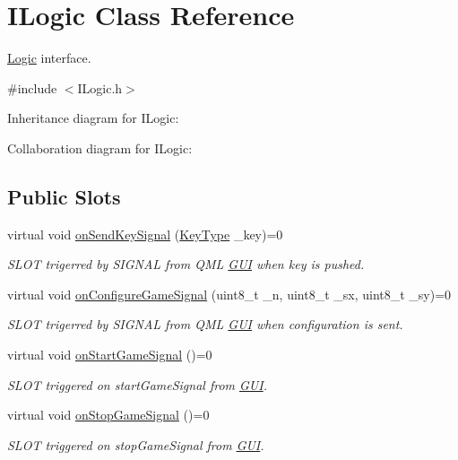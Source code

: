 \hypertarget{class_i_logic}{\section{I\+Logic Class Reference}
\label{class_i_logic}
}


\hyperlink{class_logic}{Logic} interface.  




{\ttfamily \#include $<$I\+Logic.\+h$>$}



Inheritance diagram for I\+Logic\+:


Collaboration diagram for I\+Logic\+:
\subsection*{Public Slots}
\begin{DoxyCompactItemize}
\item 
virtual void \hyperlink{class_i_logic_a9213bc5b19c4767ae204934deeca7f7e}{on\+Send\+Key\+Signal} (\hyperlink{_i_key_type_8h_aab0feaba617470cb4aa830dc5935238c}{Key\+Type} \+\_\+key)=0
\begin{DoxyCompactList}\small\item\em S\+L\+O\+T trigerred by S\+I\+G\+N\+A\+L from Q\+M\+L \hyperlink{class_g_u_i}{G\+U\+I} when key is pushed. \end{DoxyCompactList}\item 
virtual void \hyperlink{class_i_logic_a54891f02ea7efb94ac870251087499e7}{on\+Configure\+Game\+Signal} (uint8\+\_\+t \+\_\+n, uint8\+\_\+t \+\_\+sx, uint8\+\_\+t \+\_\+sy)=0
\begin{DoxyCompactList}\small\item\em S\+L\+O\+T trigerred by S\+I\+G\+N\+A\+L from Q\+M\+L \hyperlink{class_g_u_i}{G\+U\+I} when configuration is sent. \end{DoxyCompactList}\item 
virtual void \hyperlink{class_i_logic_aba088d2651916573b51cda2fd952f194}{on\+Start\+Game\+Signal} ()=0
\begin{DoxyCompactList}\small\item\em S\+L\+O\+T triggered on start\+Game\+Signal from \hyperlink{class_g_u_i}{G\+U\+I}. \end{DoxyCompactList}\item 
virtual void \hyperlink{class_i_logic_af4cc20cb1d150e2a865596b44023da8b}{on\+Stop\+Game\+Signal} ()=0
\begin{DoxyCompactList}\small\item\em S\+L\+O\+T triggered on stop\+Game\+Signal from \hyperlink{class_g_u_i}{G\+U\+I}. \end{DoxyCompactList}\end{DoxyCompactItemize}
